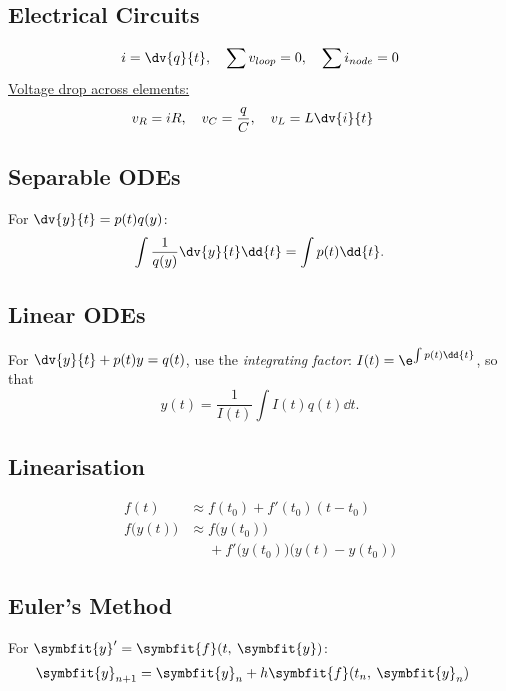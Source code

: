 \documentclass{article}
\begin{document}
\begin{multicols}{3}
    \subsection*{Electrical Circuits}
    \begin{align*}
        i = \dv{q}{t},\quad \sum v_{loop} = 0,\quad \sum i_{node} = 0
    \end{align*}
    \underline{Voltage drop across elements:}
    \begin{align*}
        v_R = iR,\quad v_C = \frac{q}{C},\quad v_L & = L \dv{i}{t}
    \end{align*}
    \subsection*{Separable ODEs}
    For $\dv{y}{t} = p(t) q(y)$:
    \begin{equation*}
        \int \frac{1}{q(y)} \dv{y}{t} \dd{t} = \int p(t) \dd{t}.
    \end{equation*}
    \subsection*{Linear ODEs}
    For $\dv{y}{t} + p(t)y = q(t)$, use the \textit{integrating factor}:
    $I(t) = \e^{\int p(t) \dd{t}}$, so that
    \begin{equation*}
        y(t) = \frac{1}{I(t)} \int I(t) q(t) \dd{t}.
    \end{equation*}
    \subsection*{Linearisation}
    \begin{align*}
        f(t)              & \approx f(t_0) + f'(t_0)(t-t_0)                                 \\
        f\bigl(y(t)\bigr) & \approx f\bigl(y(t_0)\bigr)                                     \\
                          & \phantom{\approx} + f'\bigl(y(t_0)\bigr)\bigl(y(t)-y(t_0)\bigr)
    \end{align*}
    \subsection*{Euler's Method}
    For $\symbfit{y}' = \symbfit{f}(t,\: \symbfit{y})$:
    \begin{align*}
        \symbfit{y}_{n+1} & = \symbfit{y}_{n} + h\symbfit{f}(t_n,\: \symbfit{y}_n)
    \end{align*}

\end{multicols}
\end{document}
